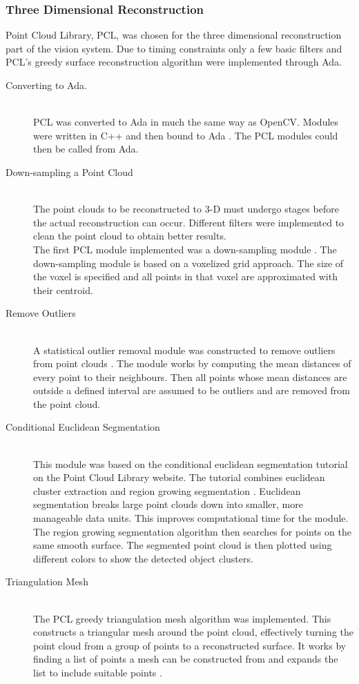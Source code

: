 \subsubsection{Three Dimensional Reconstruction} 
Point Cloud Library, PCL, was chosen for the three dimensional reconstruction part of the vision system. Due to timing constraints only a few basic filters and PCL's greedy surface reconstruction algorithm were implemented through Ada.
\begin{description}
\item[Converting to Ada.]\hfill \\
PCL was converted to Ada in much the same way as OpenCV. Modules were written in C++ and then bound to Ada \cite{web:newAdaBindings}. The PCL modules could then be called from Ada.

\item[Down-sampling a Point Cloud]\hfill \\
The point clouds to be reconstructed to 3-D must undergo stages before the actual reconstruction can occur. Different filters were implemented to clean the point cloud to obtain better results.
\\The first PCL module implemented was a down-sampling module \cite{web:pclVoxel} . The down-sampling module is based on a voxelized grid approach. The size of the voxel is specified and all points in that voxel are approximated with their centroid.	

\item[Remove Outliers]\hfill \\
A statistical outlier removal module was constructed to remove outliers from point clouds \cite{web:pclOutliers}. The module works by computing the mean distances of every point to their neighbours. Then all points whose mean distances are outside a defined interval are assumed to be outliers and are removed from the point cloud.

\item[Conditional Euclidean Segmentation]\hfill \\
This module was based on the conditional euclidean segmentation tutorial on the Point Cloud Library website\cite{web:PCL}. The tutorial combines euclidean cluster extraction \cite{RusuDoctoralDissertation} and region growing segmentation \cite{web:pclRegionGrowing}. Euclidean segmentation breaks large point clouds down into smaller, more manageable data units. This improves computational time for the module. The region growing segmentation algorithm then searches for points on the same smooth surface. The segmented point cloud is then plotted using different colors to show the detected object clusters.

\item[Triangulation Mesh]\hfill \\
The PCL greedy triangulation mesh algorithm was implemented. This constructs a triangular mesh around the point cloud, effectively turning the point cloud from a group of points to a reconstructed surface. It works by finding a list of points a mesh can be constructed from and expands the list to include suitable points \cite{Marton09ICRA}. 
 
\end{description}
